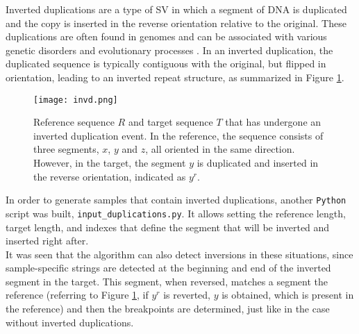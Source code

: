 Inverted duplications are a type of SV in which a segment of DNA is duplicated and the copy is inserted in the reverse orientation relative to the original. These duplications are often found in genomes and can be associated with various genetic disorders and evolutionary processes \cite{hermetz_large_2014}. In an inverted duplication, the duplicated sequence is typically contiguous with the original, but flipped in orientation, leading to an inverted repeat structure, as summarized in Figure \ref{fig:invd}.

\begin{figure}[h]

  \centering
    \texttt{[image: invd.png]}

  \caption{Reference sequence \( R \) and target sequence \( T \) that has undergone an inverted duplication event. In the reference, the sequence consists of three segments, \( x \), \( y \) and \( z \), all oriented in the same direction. However, in the target, the segment \( y \) is duplicated and inserted in the reverse orientation, indicated as \( y^r \).}
  \label{fig:invd}
\end{figure}

In order to generate samples that contain inverted duplications, another \texttt{Python} script was built, \texttt{input\_duplications.py}. It allows setting the reference length, target length, and indexes that define the segment that will be inverted and inserted right after. \\
It was seen that the algorithm can also detect inversions in these situations, since sample-specific strings are detected at the beginning and end of the inverted segment in the target. This segment, when reversed, matches a segment the reference (referring to Figure \ref{fig:invd}, if \( y^r \) is reverted, \( y \) is obtained, which is present in the reference) and then the breakpoints are determined, just like in the case without inverted duplications.
